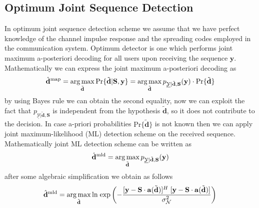 \subsection{Optimum Joint Sequence Detection}
In optimum joint sequence detection scheme we assume that we have perfect knowledge of the channel impulse response and the spreading codes employed in the communication system. Optimum detector is one which performs joint maximum a-posteriori decoding for all users upon receiving the sequence $\mathrm{\mathbf{y}}$. Mathematically we can express the joint maximum a-posteriori decoding as
\begin{equation}
\mathrm{\hat{\mathbf{d}}^{map}}=\mathop{\mathrm{arg\,max}}_{\mathrm{\tilde{\mathbf{d}}}} \mathrm{Pr}\{\mathrm{\tilde{\mathbf{d}}}\vert \mathrm{\mathbf{S}},\mathrm{\mathbf{y}}\} = \mathop{\mathrm{arg\,max}}_{\mathrm{\tilde{\mathbf{d}}}} p_{\underline{\mathcal{Y}}\vert\mathrm{\tilde{\mathbf{d}}},\mathrm{\mathbf{S}}}(\mathrm{\mathbf{y}})\cdot \mathrm{Pr}\{\mathrm{\tilde{\mathbf{d}}}\}
\end{equation}
by using Bayes rule we can obtain the second equality, now we can exploit the fact that $p_{\underline{\mathcal{Y}}\vert \mathrm{\tilde{\mathbf{d}}},\mathrm{\mathbf{S}}}$ \cite{K05} is independent from the hypothesis $\mathrm{\tilde{\mathbf{d}}}$, so it does not contribute to the decision. In case a-priori probabilities $\mathrm{Pr\{\tilde{\mathbf{d}}\}}$ is not known then we can apply joint maximum-likelihood (ML) detection scheme on the received sequence. Mathematically joint ML detection scheme can be written as
\begin{equation}
\mathrm{\hat{\mathbf{d}}^{mld}}=\mathop{\mathrm{arg\,max}}_{\mathrm{\tilde{\mathbf{d}}}}p_{\underline{\mathcal{Y}}\vert\mathrm{\tilde{\mathbf{d}}},\mathrm{\mathbf{S}}}(\mathrm{\mathbf{y}})
\end{equation}
after some algebraic simplification we obtain as follows
\begin{equation*}
\mathrm{\hat{\mathbf{d}}^{mld}}=\mathop{\mathrm{arg\,max}}_{\mathrm{\tilde{\mathbf{d}}}} \mathrm{ln\;exp}\left(-\frac{\hbox{$[\mathrm{\mathbf{y}}-\mathrm{\mathbf{S}}\cdot \mathrm{\mathbf{a}}(\mathrm{\tilde{\mathbf{d}}})]^{H}\;[\mathrm{\mathbf{y}}-\mathrm{\mathbf{S}}\cdot \mathrm{\mathbf{a}}(\mathrm{\tilde{\mathbf{d}}})]$}} {\hbox{$\sigma^2_{\mathcal{N}}$}}\right) \\ \\
\end{equation*}

